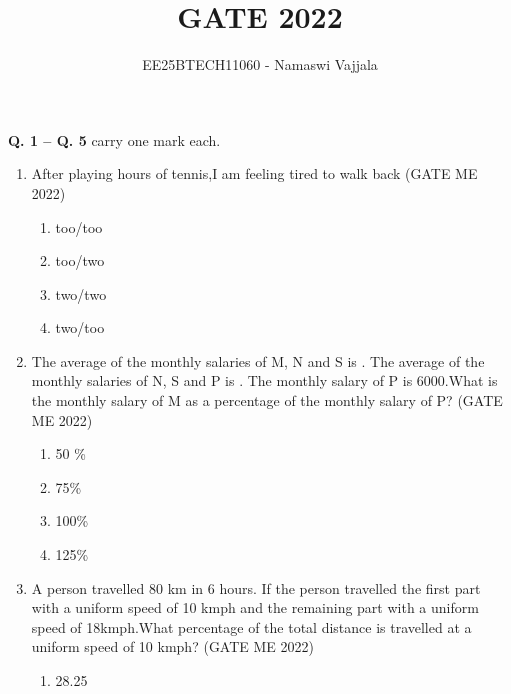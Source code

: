 \documentclass[journal]{IEEEtran}
\numberwithin{equation}{enumi}
\numberwithin{figure}{enumi}
\begin{document}

\vspace{3cm}

\title{GATE 2022}
\author{EE25BTECH11060 - Namaswi Vajjala}
\maketitle

\noindent \textbf{Q. 1 -- Q. \textbf{5}} carry one mark each.

\begin{enumerate}
\item After playing  \underline{\hspace{2cm}} hours of tennis,I am feeling \underline{\hspace{2cm}} tired to walk back
\hfill{(GATE ME 2022)}
\begin{multicols}{2}
    \begin{enumerate}
        \item too/too
        \item too/two
        \item two/two
        \item two/too
    \end{enumerate}
\end{multicols}
\item  The average of the monthly salaries of M, N and S is . The average of the monthly salaries of N, S and P is . The monthly salary of P is \rupee 6000.What is the monthly salary of M as a percentage of the monthly salary of P? 
\hfill{(GATE ME 2022)}
\begin{multicols}{4}
    \begin{enumerate}
        \item 50 \%
        \item 75\%
        \item  100\%
        \item  125\%
    \end{enumerate}
\end{multicols}
\item A person travelled 80 km in 6 hours. If the person travelled the first part with a uniform speed of 10 kmph and the remaining part with a uniform speed of 18kmph.What percentage of the total distance is travelled at a uniform speed of 10 kmph?
\hfill{(GATE ME 2022)}
\begin{multicols}{4}
    \begin{enumerate}
        \item 28.25

\end{enumerate}
\end{multicols}
\end{enumerate}
\end{document}
